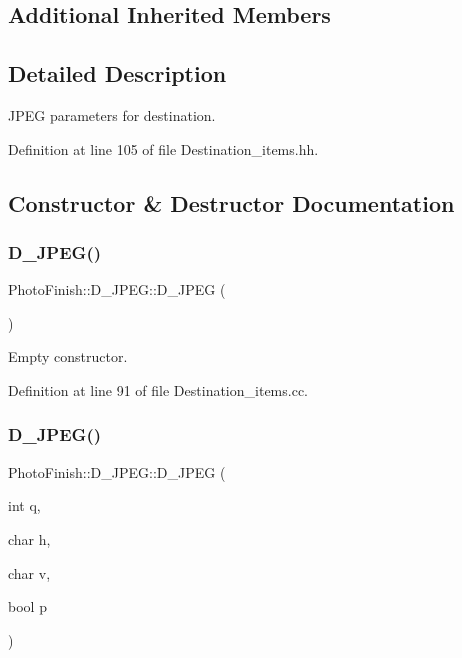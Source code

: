 \subsection*{Additional Inherited Members}


\subsection{Detailed Description}
J\+P\+EG parameters for destination. 

Definition at line 105 of file Destination\+\_\+items.\+hh.



\subsection{Constructor \& Destructor Documentation}
\mbox{\label{class_photo_finish_1_1_d___j_p_e_g_a7a8a47f864985558358aa9486af485ae}} 
\subsubsection{\texorpdfstring{D\+\_\+\+J\+P\+E\+G()}{D\_JPEG()}\hspace{0.1cm}{\footnotesize\ttfamily [1/2]}}
{\footnotesize\ttfamily Photo\+Finish\+::\+D\+\_\+\+J\+P\+E\+G\+::\+D\+\_\+\+J\+P\+EG (\begin{DoxyParamCaption}{ }\end{DoxyParamCaption})}



Empty constructor. 



Definition at line 91 of file Destination\+\_\+items.\+cc.

\mbox{\label{class_photo_finish_1_1_d___j_p_e_g_a94e2ea63fa1e3fd9c6a696eb15f44bf8}} 
\subsubsection{\texorpdfstring{D\+\_\+\+J\+P\+E\+G()}{D\_JPEG()}\hspace{0.1cm}{\footnotesize\ttfamily [2/2]}}
{\footnotesize\ttfamily Photo\+Finish\+::\+D\+\_\+\+J\+P\+E\+G\+::\+D\+\_\+\+J\+P\+EG (\begin{DoxyParamCaption}\item[{int}]{q,  }\item[{char}]{h,  }\item[{char}]{v,  }\item[{bool}]{p }\end{DoxyParamCaption})}




